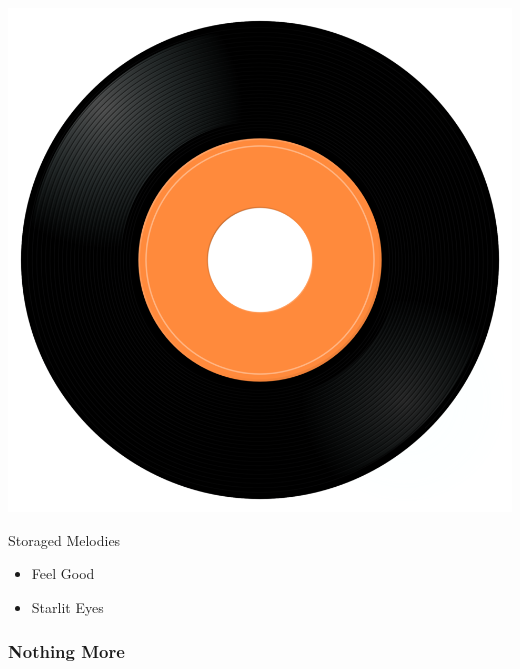 \begin{minipage}[t]{0.25\textwidth}
\captionsetup{type=figure}
\includegraphics[width=\textwidth]{Images/cover.png}
\caption*{Storaged Melodies}
\end{minipage}
\begin{minipage}[t]{0.25\textwidth}\vspace{0pt}
\begin{itemize}[nosep,leftmargin=1em,labelwidth=*,align=left]
	\setlength{\itemsep}{0pt}
	\item Feel Good
	\item Starlit Eyes
\end{itemize}
\end{minipage}

\subsubsection{Nothing More}

